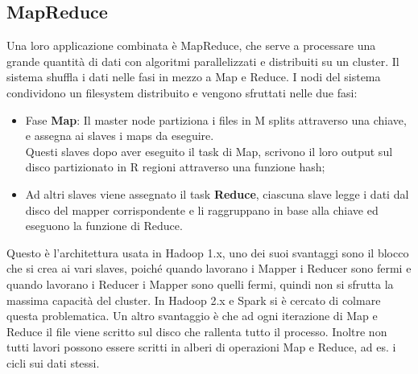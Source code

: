 \documentclass[11pt, twocolumn]{article}
\newenvironment{myitemize}
{ \begin{itemize}[topsep=0ex]
		\setlength{\itemsep}{0pt}
		\setlength{\parskip}{0pt}
		\setlength{\parsep}{0pt}     }
	{ \end{itemize}                  }
\begin{document}
\subsection{MapReduce}
Una loro applicazione combinata è MapReduce, che serve a processare una grande quantità di dati con algoritmi parallelizzati e distribuiti su un cluster. 
Il sistema shuffla i dati nelle fasi in mezzo a Map e Reduce. 
I nodi del sistema condividono un filesystem distribuito e vengono sfruttati nelle due fasi:
\begin{myitemize}
	\item Fase \textbf{Map}: Il master node partiziona i files in M splits attraverso una chiave, e assegna ai slaves i maps da eseguire.\\
	Questi slaves dopo aver eseguito il task di Map, scrivono il loro output sul disco partizionato in R regioni attraverso una funzione hash;
	\item Ad altri slaves viene assegnato il task \textbf{Reduce}, ciascuna slave legge i dati dal disco del mapper corrispondente e li raggruppano in base alla chiave ed eseguono la funzione di Reduce.
\end{myitemize}
Questo è l'architettura usata in Hadoop 1.x, uno dei suoi svantaggi sono il blocco che si crea ai vari slaves, poiché quando lavorano i Mapper i Reducer sono fermi e quando lavorano i Reducer i Mapper sono quelli fermi, quindi non si sfrutta la massima capacità del cluster. In Hadoop 2.x e Spark si è cercato di colmare questa problematica. 
Un altro svantaggio è che ad ogni iterazione di Map e Reduce il file viene scritto sul disco che rallenta tutto il processo. 
Inoltre non tutti lavori possono essere scritti in alberi di operazioni Map e Reduce, ad es. i cicli sui dati stessi.\\
\end{document}

